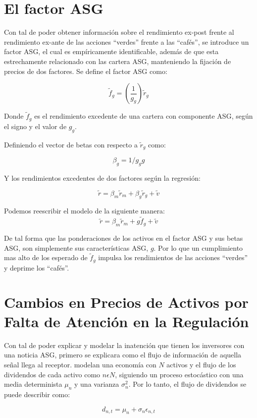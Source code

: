 \section{El factor ASG}

Con tal de poder obtener información sobre el rendimiento ex-post frente al rendimiento ex-ante de las acciones ``verdes'' frente a las ``cafés'', se introduce un factor ASG, el cual es empíricamente identificable, además de que esta estrechamente relacionado con las cartera ASG, manteniendo la fijación de precios de dos factores. Se define el factor ASG como:

$$\tilde f_g = \left(\frac{1}{g_g}\right)\tilde{r}_g$$

Donde $\tilde f_g$ es el rendimiento excedente de una cartera con componente ASG, según el signo y el valor de $g_g$.

Definiendo el vector de betas con respecto a $\tilde r_g$ como:

$$\beta_g = 1/g_g g$$

Y los rendimientos excedentes de dos factores según la regresión:

$$\tilde{r} = \beta_m\tilde{r}_m + \beta_g\tilde{r}_g + \tilde{v}$$

Podemos reescribir el modelo de la siguiente manera:
$$\tilde{r} = \beta_m\tilde{r}_m + g \tilde{f}_g + \tilde{v}$$

De tal forma que las ponderaciones de los activos en el factor ASG y sus betas ASG, son simplemente sus características ASG, $g$. Por lo que un cumplimiento mas alto de los esperado de $\tilde f_g$ impulsa los rendimientos de las acciones ``verdes'' y deprime los ``cafés''.

\section{Cambios en Precios de Activos por Falta de Atención en la Regulación}

Con tal de poder explicar y modelar la inatención que tienen los inversores con una noticia ASG, primero se explicara como el flujo de información de aquella señal llega al receptor. \cite{heinke_rational_2016} modelan una economía con $N$ activos y el flujo de los dividendos de cada activo como $n \epsilon N$, siguiendo un proceso estocástico con una media determinista $\mu_n$ y una varianza $\sigma^{2}_n$. Por lo tanto, el flujo de dividendos se puede describir como: 

$$d_{n,t} = \mu_n + \sigma_n \epsilon_{n,t}$$

